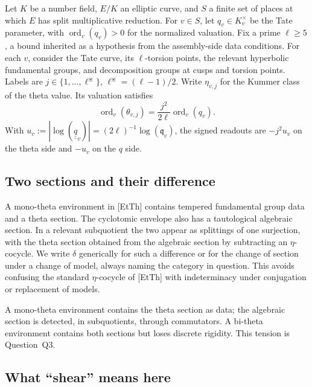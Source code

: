 \documentclass[11pt]{article}
\newcommand{\uu}[1]{\underline{\underline{#1}}}
\newcommand{\ord}{\operatorname{ord}}
\theoremstyle{definition}
\begin{document}
Let $K$ be a number field, $E/K$ an elliptic curve, and $S$ a
finite set of places at which $E$ has split multiplicative
reduction.  For $v\in S$, let $q_v\in K_v^\times$ be the Tate
parameter, with $\ord_v(q_v)>0$ for the normalized valuation.
Fix a prime $\ell\ge5$, a bound inherited as a hypothesis from
the assembly-side data conditions.  For each $v$, consider the
Tate curve, its $\ell$-torsion points, the relevant hyperbolic
fundamental groups, and decomposition groups at cusps and torsion
points.  Labels are $j\in\{1,\ldots,\ell^\divideontimes\}$,
$\ell^\divideontimes=(\ell-1)/2$.  Write $\eta_{v,j}$ for the
Kummer class of the theta value.  Its valuation satisfies
\[
\ord_v(\theta_{v,j})
 =\frac{j^2}{2\ell}\ord_v(q_v).
\]
With $u_v:=|\log(\uu q_v)|=(2\ell)^{-1}\log(\mathfrak q_v)$,
the signed readouts are $-j^2u_v$ on the theta side and $-u_v$ on
the $q$ side.

\subsection{Two sections and their difference}

A mono-theta environment in [EtTh] contains tempered fundamental
group data and a theta section.  The cyclotomic envelope also has
a tautological algebraic section.  In a relevant subquotient the
two appear as splittings of one surjection, with the theta
section obtained from the algebraic section by subtracting an
$\eta$-cocycle.  We write $\delta$ generically for such a
difference or for the change of section under a change of model,
always naming the category in question.  This avoids confusing
the standard $\eta$-cocycle of [EtTh] with indeterminacy under
conjugation or replacement of models.

A mono-theta environment contains the theta section as data; the
algebraic section is detected, in subquotients, through
commutators.  A bi-theta environment contains both sections but
loses discrete rigidity.  This tension is Question~Q3.

\subsection{What ``shear'' means here}
\end{document}
